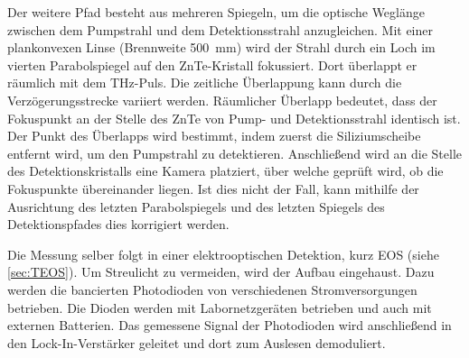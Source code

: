 Der weitere Pfad besteht aus mehreren Spiegeln, um die optische Weglänge zwischen dem Pumpstrahl und dem Detektionsstrahl anzugleichen. 
Mit einer plankonvexen Linse (Brennweite \SI{500}{mm}) wird der Strahl durch ein Loch im vierten Parabolspiegel auf den ZnTe-Kristall fokussiert.
Dort überlappt er räumlich mit dem THz-Puls. Die zeitliche Überlappung kann durch die Verzögerungsstrecke variiert werden. 
Räumlicher Überlapp bedeutet, dass der Fokuspunkt an der Stelle des ZnTe von Pump- und Detektionsstrahl identisch ist. 
Der Punkt des Überlapps wird bestimmt, indem zuerst die Siliziumscheibe entfernt wird, um den Pumpstrahl zu detektieren. 
Anschließend wird an die Stelle des Detektionskristalls eine Kamera platziert, über welche geprüft wird, ob die 
Fokuspunkte übereinander liegen. 
Ist dies nicht der Fall, kann mithilfe der Ausrichtung des letzten Parabolspiegels und des letzten Spiegels 
des Detektionspfades dies korrigiert werden.

Die Messung selber folgt in einer elektrooptischen Detektion, kurz EOS (siehe \autoref{sec:TEOS}). 
Um Streulicht zu vermeiden, wird der Aufbau eingehaust. 
Dazu werden die bancierten Photodioden von verschiedenen Stromversorgungen betrieben. 
Die Dioden werden mit Labornetzgeräten betrieben und auch mit externen Batterien. 
Das gemessene Signal der Photodioden wird anschließend in den Lock-In-Verstärker geleitet und dort zum Auslesen demoduliert.












